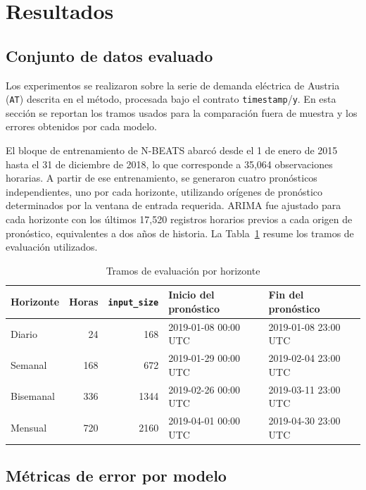 \section{Resultados}

\subsection{Conjunto de datos evaluado}

Los experimentos se realizaron sobre la serie de demanda eléctrica de Austria (\texttt{AT}) descrita en el método, procesada bajo el contrato \texttt{timestamp}/\texttt{y}. En esta sección se reportan los tramos usados para la comparación fuera de muestra y los errores obtenidos por cada modelo.

El bloque de entrenamiento de N-BEATS abarcó desde el 1 de enero de 2015 hasta el 31 de diciembre de 2018, lo que corresponde a 35,064 observaciones horarias. A partir de ese entrenamiento, se generaron cuatro pronósticos independientes, uno por cada horizonte, utilizando orígenes de pronóstico determinados por la ventana de entrada requerida. ARIMA fue ajustado para cada horizonte con los últimos 17,520 registros horarios previos a cada origen de pronóstico, equivalentes a dos años de historia. La Tabla~\ref{tab:tramos-evaluacion} resume los tramos de evaluación utilizados.

\begin{table}[htbp]
    \centering
    \caption{Tramos de evaluación por horizonte}
    \label{tab:tramos-evaluacion}
    \begin{tabular}{lrrll}
        \toprule
        Horizonte & Horas & \texttt{input\_size} & Inicio del pronóstico & Fin del pronóstico \\
        \midrule
        Diario & 24 & 168 & 2019-01-08 00:00 UTC & 2019-01-08 23:00 UTC \\
        Semanal & 168 & 672 & 2019-01-29 00:00 UTC & 2019-02-04 23:00 UTC \\
        Bisemanal & 336 & 1344 & 2019-02-26 00:00 UTC & 2019-03-11 23:00 UTC \\
        Mensual & 720 & 2160 & 2019-04-01 00:00 UTC & 2019-04-30 23:00 UTC \\
        \bottomrule
    \end{tabular}
\end{table}

\subsection{Métricas de error por modelo}

